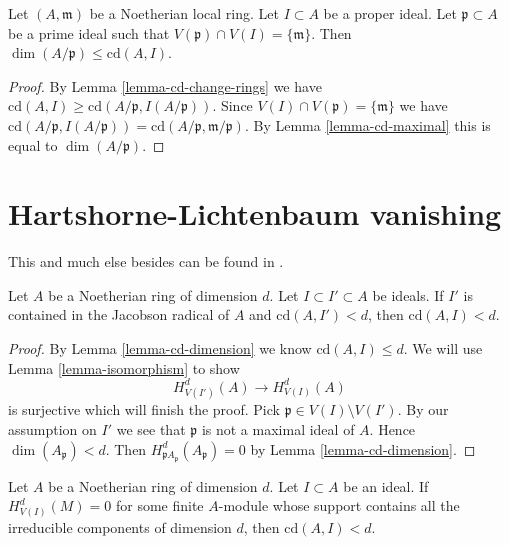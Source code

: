 \begin{lemma}
\label{lemma-cd-bound-dim-local}
Let $(A, \mathfrak m)$ be a Noetherian local ring.
Let $I \subset A$ be a proper ideal.
Let $\mathfrak p \subset A$ be a prime ideal
such that $V(\mathfrak p) \cap V(I) = \{\mathfrak m\}$.
Then $\dim(A/\mathfrak p) \leq \text{cd}(A, I)$.
\end{lemma}

\begin{proof}
By Lemma \ref{lemma-cd-change-rings} we have
$\text{cd}(A, I) \geq \text{cd}(A/\mathfrak p, I(A/\mathfrak p))$.
Since $V(I) \cap V(\mathfrak p) = \{\mathfrak m\}$ we have
$\text{cd}(A/\mathfrak p, I(A/\mathfrak p)) =
\text{cd}(A/\mathfrak p, \mathfrak m/\mathfrak p)$.
By Lemma \ref{lemma-cd-maximal} this is equal to $\dim(A/\mathfrak p)$.
\end{proof}







\section{Hartshorne-Lichtenbaum vanishing}
\label{section-Hartshorne-Lichtenbaum-vanishing}

\noindent
This and much else besides can be found in \cite{CD}.

\begin{lemma}
\label{lemma-cd-top-vanishing}
Let $A$ be a Noetherian ring of dimension $d$. Let $I \subset I' \subset A$
be ideals. If $I'$ is contained in the Jacobson radical
of $A$ and $\text{cd}(A, I') < d$, then $\text{cd}(A, I) < d$.
\end{lemma}

\begin{proof}
By Lemma \ref{lemma-cd-dimension} we know $\text{cd}(A, I) \leq d$.
We will use Lemma \ref{lemma-isomorphism} to show
$$
H^d_{V(I')}(A) \to H^d_{V(I)}(A)
$$
is surjective which will finish the proof. Pick
$\mathfrak p \in V(I) \setminus V(I')$. By our assumption
on $I'$ we see that $\mathfrak p$ is not a maximal ideal of $A$.
Hence $\dim(A_\mathfrak p) < d$. Then
$H^d_{\mathfrak pA_\mathfrak p}(A_\mathfrak p) = 0$
by Lemma \ref{lemma-cd-dimension}.
\end{proof}

\begin{lemma}
\label{lemma-cd-top-vanishing-some-module}
Let $A$ be a Noetherian ring of dimension $d$. Let $I \subset A$
be an ideal. If $H^d_{V(I)}(M) = 0$ for some finite $A$-module
whose support contains all the irreducible components of
dimension $d$, then $\text{cd}(A, I) < d$.
\end{lemma}

